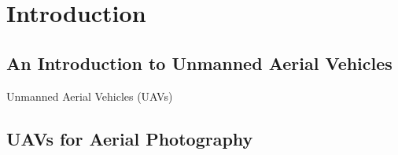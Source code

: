 
\chapter{Introduction}  %
\label{intro}

\ifpdf
    \graphicspath{{Chapter1/Figs/Raster/}{Chapter1/Figs/PDF/}{Chapter1/Figs/}}
\else
    \graphicspath{{Chapter1/Figs/Vector/}{Chapter1/Figs/}}
\fi


\section{An Introduction to Unmanned Aerial Vehicles} 
\label{intro:UAVs}

Unmanned Aerial Vehicles (UAVs) 

\section{UAVs for Aerial Photography} 
\label{intro:photography}



